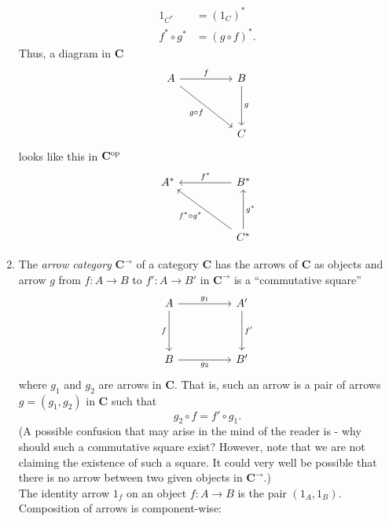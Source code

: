 \begin{enumerate}
	\begin{align*} 
		1_{C^*} &= (1_C)^*\\
		f^*\circ g^* &= (g \circ f)^*.
	\end{align*}
	Thus, a diagram in $\mathbf{C}$
	\begin{equation*} 
		\begin{tikzcd}
			A \arrow[rr, "f"] \arrow[rrdd, "g\circ f"'] && B \arrow[dd, "g"]\\
			&&\\
			&& C
		\end{tikzcd}
	\end{equation*}
	looks like this in $\mathbf{C}^{\operatorname{op}}$
	\begin{equation*} 
		\begin{tikzcd}
			A^* && \arrow[ll, "f^*"'] B^* \\
			&&\\
			&& \arrow[lluu, "f^*\circ g^*"]\arrow[uu, "g^*"'] C^*
		\end{tikzcd}
	\end{equation*}
	\item The \emph{arrow category} $\mathbf{C}^\to$ of a category $\mathbf{C}$ has the arrows of $\mathbf{C}$ as objects and arrow $g$ from $f:A\to B$ to $f':A\to B'$ in $\mathbf{C}^\to$ is a ``commutative square''
	\begin{equation*} 
		\begin{tikzcd}
		A \arrow[dd, "f"'] \arrow[rr, "g_1"] &  & A' \arrow[dd, "f'"] \\
		                                     &  &                     \\
		B \arrow[rr, "g_2"']                 &  & B'                 
		\end{tikzcd}
	\end{equation*}
	where $g_1$ and $g_2$ are arrows in $\mathbf{C}.$ That is, such an arrow is a pair of arrows $g = (g_1, g_2)$ in $\mathbf{C}$ such that
	\begin{equation*} 
		g_2\circ f = f'\circ g_1.
	\end{equation*}
	(A possible confusion that may arise in the mind of the reader is - why should such a commutative square exist? However, note that we are not claiming the existence of such a square. It could very well be possible that there is no arrow between two given objects in $\mathbf{C}^\to$.)\\
	The identity arrow $1_f$ on an object $f:A\to B$ is the pair $(1_A, 1_B).$\\
	Composition of arrows is component-wise:

\end{enumerate}
